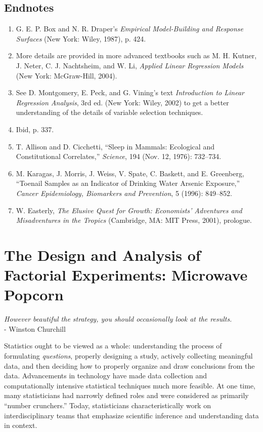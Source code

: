 \documentclass[
]{report}
\begin{document}
\hypertarget{endnotes-1}{%
\section*{\texorpdfstring{\textbf{Endnotes}}{Endnotes}}\label{endnotes-1}}

\begin{enumerate}
  \item G. E. P. Box and N. R. Draper’s \textit{Empirical Model-Building and Response Surfaces} (New York: Wiley, 1987), p. 424.
  \item More details are provided in more advanced textbooks such as M. H. Kutner, J. Neter, C. J. Nachtsheim, and W. Li, \textit{Applied Linear Regression Models} (New York: McGraw-Hill, 2004).
  \item See D. Montgomery, E. Peck, and G. Vining’s text \textit{Introduction to Linear Regression Analysis}, 3rd ed. (New York: Wiley, 2002) to get a better understanding of the details of variable selection techniques.
  \item Ibid, p. 337.
  \item T. Allison and D. Cicchetti, “Sleep in Mammals: Ecological and Constitutional Correlates,” \textit{Science}, 194 (Nov. 12, 1976): 732–734.
  \item M. Karagas, J. Morris, J. Weiss, V. Spate, C. Baskett, and E. Greenberg, “Toenail Samples as an Indicator of Drinking Water Arsenic Exposure,” \textit{Cancer Epidemiology, Biomarkers and Prevention}, 5 (1996): 849–852.
  \item W. Easterly, \textit{The Elusive Quest for Growth: Economists’ Adventures and Misadventures in the Tropics} (Cambridge, MA: MIT Press, 2001), prologue.
\end{enumerate}

\hypertarget{the-design-and-analysis-of-factorial-experiments-microwave-popcorn}{%
\chapter{The Design and Analysis of Factorial Experiments: Microwave Popcorn}\label{the-design-and-analysis-of-factorial-experiments-microwave-popcorn}}

{ \emph{However beautiful the strategy, you should occasionally look at the results.} }\\
{ - Winston Churchill}

Statistics ought to be viewed as a whole: understanding the process of formulating \emph{questions}, properly designing a study, actively collecting meaningful data, and then deciding how to properly organize and draw conclusions from the data. Advancements in technology have made data collection and computationally intensive statistical techniques much more feasible. At one time, many statisticians had narrowly defined roles and were considered as primarily ``number crunchers.'' Today, statisticians characteristically work on interdisciplinary teams that emphasize scientific inference and understanding data in context.
\end{document}
